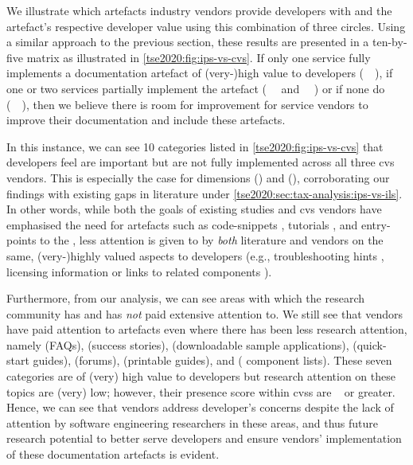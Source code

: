 We illustrate which artefacts industry vendors provide developers with and the artefact's respective developer value using this combination of three circles. Using a similar approach to the previous section, these results are presented in a ten-by-five matrix as illustrated in \cref{tse2020:fig:ips-vs-cvs}. If only one service fully implements a documentation artefact of \mbox{(very-)high} value to developers ({\small \circlepresent{}~\circlenotpresent{}~\circlenotpresent{}}), if one or two services partially implement the artefact ({\small \circlepartialpresent{}~\circlenotpresent{}~\circlenotpresent{}} and {\small \circlepartialpresent{}~\circlepartialpresent{}{}~\circlenotpresent{}{}}) or if none do ({\small \circlenotpresent{}~\circlenotpresent{}~\circlenotpresent{}}), then we believe there is room for improvement for service vendors to improve their documentation and include these artefacts.

In this instance, we can see 10 categories listed in \cref{tse2020:fig:ips-vs-cvs} that developers feel are important but are not fully implemented across all three \gls{cvs} vendors. This is especially the case for dimensions   (\dima{}) and  (\dimd{}), corroborating our findings with existing gaps in literature under \cref{tse2020:sec:tax-analysis:ips-vs-ils}. In other words, while both the goals of existing studies and \gls{cvs} vendors have emphasised the need for artefacts such as code-snippets , tutorials , and entry-points to the  , less attention is given to by \textit{both} literature and vendors on the same, \mbox{(very-)highly} valued aspects to developers (e.g., troubleshooting hints , licensing information  or links to related components ).

Furthermore, from our analysis, we can see areas with which the research community has and has \textit{not} paid extensive attention to. We still see that vendors have paid attention to artefacts even where there has been less research attention, namely  (FAQs),  (success stories),  (downloadable sample applications),  (quick-start guides),  (forums),  (printable guides), and  ( component lists). These seven categories are of (very) high value to developers but research attention on these topics are (very) low; however, their presence score within \glspl{cvs} are {\small\circlepresent{}{}{} \circlepartialpresent{}~\circlepartialpresent{}{}} or greater. Hence, we can see that vendors address developer's concerns despite the lack of attention by software engineering researchers in these areas, and thus future research potential to better serve developers and ensure vendors' implementation of these documentation artefacts is evident.

